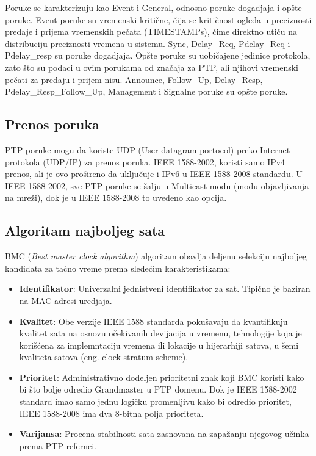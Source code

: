 \documentclass[a4paper,12pt, master]{etf}
\begin{document}
	Poruke se karakterizuju kao Event i General, odnosno poruke dogadjaja i
	op\v{s}te poruke. Event	poruke su vremenski kriti\v{c}ne, \v{c}ija se
	kriti\v{c}nost ogleda u preciznosti	predaje i prijema vremenskih pe\v{c}ata
	(TIMESTAMPs), \v{c}ime direktno	uti\v{c}u na distribuciju preciznosti
	vremena u sistemu. Sync, Delay\_Req, Pdelay\_Req i Pdelay\_resp su poruke
	dogadjaja. Op\v{s}te poruke su uobi\v{c}ajene jedinice protokola, zato
	\v{s}to su podaci u ovim porukama od zna\v{c}aja za PTP, ali njihovi
	vremenski pe\v{c}ati za predaju i prijem nisu. Announce, Follow\_Up,
	Delay\_Resp, Pdelay\_Resp\_Follow\_Up, Management i Signalne poruke su
	op\v{s}te poruke.

	\subsection{Prenos poruka}

	PTP poruke mogu da koriste UDP (User datagram portocol) preko Internet
	protokola (UDP/IP) za prenos poruka. IEEE 1588-2002, koristi samo IPv4
	prenos, ali je ovo pro\v{s}ireno da	uklju\v{c}uje i IPv6 u IEEE 1588-2008
	standardu. U IEEE 1588-2002, sve PTP poruke se \v{s}alju u Multicast modu
	(modu objavljivanja na mre\v{z}i), dok je u IEEE 1588-2008 to uvedeno kao
    opcija.

	\subsection{Algoritam najboljeg sata}
	BMC (\textit{Best master clock algorithm}) algoritam obavlja deljenu
	selekciju najboljeg kandidata za ta\v{c}no vreme prema slede\'{c}im
	karakteristikama:

	\begin{itemize}
        \item \textbf{Identifikator}: Univerzalni jednistveni identifikator za
        sat. Tipi\v{c}no je baziran na MAC adresi uredjaja.
        \item \textbf{Kvalitet}: Obe verzije IEEE 1588 standarda poku\v{s}avaju
        da kvantifikuju kvalitet sata na osnovu o\v{c}ekivanih devijacija u
		vremenu, tehnologije koja je kori\v{s}\'{c}ena za implemntaciju vremena
		ili lokacije u hijerarhiji satova, u \v{s}emi kvaliteta satova (eng\@.
        clock stratum scheme).
        \item \textbf{Prioritet}: Administrativno dodeljen prioritetni znak koji
        BMC koristi kako bi \v{s}to bolje odredio Grandmaster u PTP domenu. Dok
        je IEEE 1588-2002 standard imao samo jednu logi\v{c}ku promenljivu kako
        bi odredio prioritet, IEEE 1588-2008 ima dva 8-bitna polja prioriteta.
        \item \textbf{Varijansa}: Procena stabilnosti sata zasnovana na
        zapa\v{z}anju njegovog u\v{c}inka prema PTP refernci.
	\end{itemize}
\end{document}
